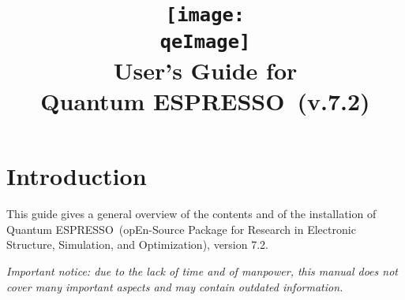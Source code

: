 \documentclass[12pt,a4paper]{article}
\def\version{7.2}
\def\qe{{\sc Quantum ESPRESSO}}
\begin{document}
\author{}
\date{}

\def\qeImage{quantum_espresso}

\title{
  \texttt{[image: \\qeImage]} \\
  \Huge User's Guide for \\ \qe\ (v.\version)
}

\maketitle

\tableofcontents

\section{Introduction}

This guide gives a general overview of the contents and of the installation
of \qe\ (opEn-Source Package for Research in Electronic Structure, Simulation,
and Optimization), version \version.

{\em Important notice: due to the lack of time and of manpower, this
  manual does not cover many important aspects and may contain outdated
  information.}
\end{document}
